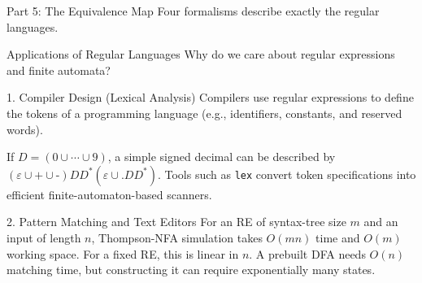 \documentclass[10pt]{beamer}
\begin{document}
\begin{frame}{Part 5: The Equivalence Map}
  Four formalisms describe exactly the regular languages.
  \pause

  \begin{center}
  \end{center}
\end{frame}

\begin{frame}{Applications of Regular Languages}
  Why do we care about regular expressions and finite automata?
  \pause

  \begin{block}{1. Compiler Design (Lexical Analysis)}
    Compilers use regular expressions to define the tokens of a programming
    language (e.g., identifiers, constants, and reserved words).

    If $D=(0\cup\cdots\cup9)$, a simple signed decimal can be described by
    $(\varepsilon\cup\texttt{+}\cup\texttt{-})DD^*(\varepsilon\cup\texttt{.}DD^*)$.
    Tools such as \texttt{lex} convert token specifications into efficient
    finite-automaton-based scanners.
  \end{block}
  \pause

  \begin{block}{2. Pattern Matching and Text Editors}
    For an RE of syntax-tree size $m$ and an input of length $n$, Thompson-NFA
    simulation takes $O(mn)$ time and $O(m)$ working space. For a fixed RE,
    this is linear in $n$. A prebuilt DFA needs $O(n)$ matching time, but
    constructing it can require exponentially many states.
  \end{block}
\end{frame}
\end{document}
